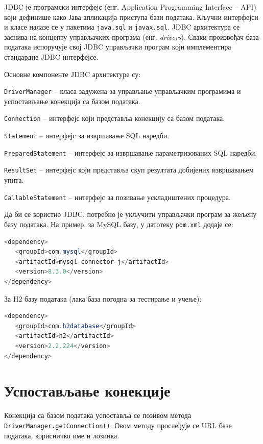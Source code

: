JDBC је програмски интерфејс (енг. Application Programming Interface – API) који дефинише како Јава апликација приступа бази података. Кључни интерфејси и класе налазе се у пакетима \texttt{java.sql} и \texttt{javax.sql}. JDBC архитектура се заснива на концепту управљачких програма (енг. \textit{drivers}). Сваки произвођач база података испоручује свој JDBC управљачки програм који имплементира стандардне JDBC интерфејсе.

Основне компоненте JDBC архитектуре су:

\texttt{DriverManager} – класа задужена за управљање управљачким програмима и успостављање конекција са базом података.

\texttt{Connection} – интерфејс који представља конекцију са базом података.

\texttt{Statement} – интерфејс за извршавање SQL наредби.

\texttt{PreparedStatement} – интерфејс за извршавање параметризованих SQL наредби.

\texttt{ResultSet} – интерфејс који представља скуп резултата добијених извршавањем упита.

\texttt{CallableStatement} – интерфејс за позивање ускладиштених процедура.

Да би се користио JDBC, потребно је укључити управљачки програм за жељену базу података. На пример, за MySQL базу, у датотеку \texttt{pom.xml} додаје се:


\begin{lstlisting}[language=Java]
<dependency>
   <groupId>com.mysql</groupId>
   <artifactId>mysql-connector-j</artifactId>
   <version>8.3.0</version>
</dependency>
\end{lstlisting}


За H2 базу података (лака база погодна за тестирање и учење):


\begin{lstlisting}[language=Java]
<dependency>
   <groupId>com.h2database</groupId>
   <artifactId>h2</artifactId>
   <version>2.2.224</version>
</dependency>
\end{lstlisting}


\section{Успостављање конекције}

Конекција са базом података успоставља се позивом метода \texttt{DriverManager.getConnection()}. Овом методу прослеђује се URL базе података, корисничко име и лозинка.

